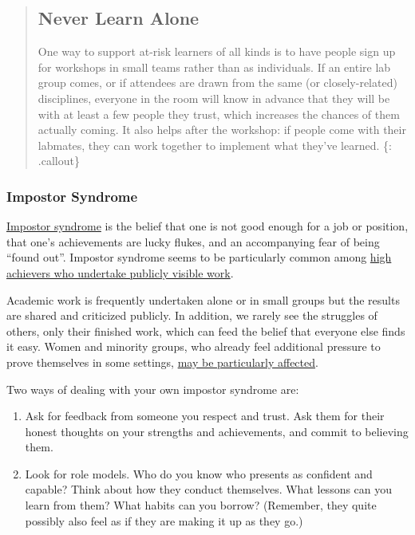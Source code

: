 \begin{quote}
\subsection{Never Learn Alone}\label{never-learn-alone}

One way to support at-risk learners of all kinds is to have people sign
up for workshops in small teams rather than as individuals. If an entire
lab group comes, or if attendees are drawn from the same (or
closely-related) disciplines, everyone in the room will know in advance
that they will be with at least a few people they trust, which increases
the chances of them actually coming. It also helps after the workshop:
if people come with their labmates, they can work together to implement
what they've learned. \{: .callout\}
\end{quote}

\subsubsection{Impostor Syndrome}\label{impostor-syndrome}

\href{https://en.wikipedia.org/wiki/Impostor_syndrome}{Impostor
syndrome} is the belief that one is not good enough for a job or
position, that one's achievements are lucky flukes, and an accompanying
fear of being ``found out''. Impostor syndrome seems to be particularly
common among
\href{https://www.usenix.org/blog/impostor-syndrome-proof-yourself-and-your-community}{high
achievers who undertake publicly visible work}.

Academic work is frequently undertaken alone or in small groups but the
results are shared and criticized publicly. In addition, we rarely see
the struggles of others, only their finished work, which can feed the
belief that everyone else finds it easy. Women and minority groups, who
already feel additional pressure to prove themselves in some settings,
\href{http://www.paulineroseclance.com/pdf/ip_high_achieving_women.pdf}{may
be particularly affected}.

Two ways of dealing with your own impostor syndrome are:

\begin{enumerate}
\def\labelenumi{\arabic{enumi}.}
\itemsep1pt\parskip0pt
\item
  Ask for feedback from someone you respect and trust. Ask them for
  their honest thoughts on your strengths and achievements, and commit
  to believing them.
\item
  Look for role models. Who do you know who presents as confident and
  capable? Think about how they conduct themselves. What lessons can you
  learn from them? What habits can you borrow? (Remember, they quite
  possibly also feel as if they are making it up as they go.)
\end{enumerate}


